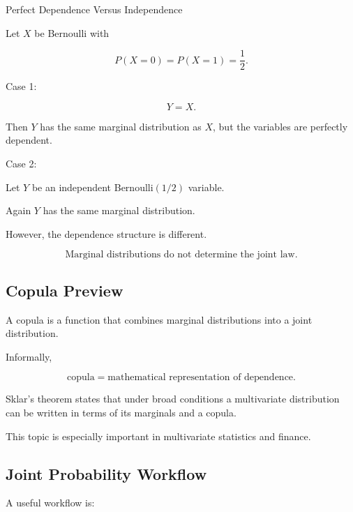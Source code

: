 \begin{workedexamplebox}{Perfect Dependence Versus Independence}

Let \(X\) be Bernoulli with

\[
P(X=0)=P(X=1)=\frac12.
\]

Case 1:

\[
Y=X.
\]

Then \(Y\) has the same marginal distribution as \(X\), but the variables
are perfectly dependent.

Case 2:

Let \(Y\) be an independent Bernoulli\((1/2)\) variable.

Again \(Y\) has the same marginal distribution.

However, the dependence structure is different.

\begin{answerbox}
\[
\boxed{
\text{Marginal distributions do not determine the joint law.}
}
\]
\end{answerbox}

\end{workedexamplebox}

\subsection{Copula Preview}
\label{subsec:copula-preview}

A copula is a function that combines marginal distributions into a joint
distribution.

Informally,

\[
\boxed{
\text{copula}
=
\text{mathematical representation of dependence}.
}
\]

Sklar's theorem states that under broad conditions a multivariate
distribution can be written in terms of its marginals and a copula.

This topic is especially important in multivariate statistics and
finance.

\subsection{Joint Probability Workflow}
\label{subsec:joint-probability-workflow}

A useful workflow is:

